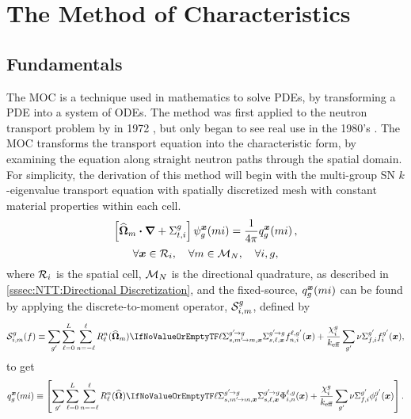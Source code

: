 \chapter{The Method of Characteristics}{\label{ch:The Method of Characteristics}
    
    
    
    \def\figpath{chapters/03/figures/}
    \graphicspath{ {\figpath} }

    \section{Fundamentals}{\label{sec:MOC:Fundamentals}
        The \acf{MOC} is a technique used in mathematics to solve \acp{PDE}, by transforming a \ac{PDE} into a system of \acp{ODE}.
        The method was first applied to the neutron transport problem by \citeauthor{Askew1972} in 1972 \cite{Askew1972}, but only began to see real use in the 1980's \cite{Halsall1980}.
        The \ac{MOC} transforms the transport equation into the characteristic form, by examining the equation along straight neutron paths through the spatial domain.
        For simplicity, the derivation of this method will begin with the multi-group \ac{SN} $k$-eigenvalue transport equation with spatially discretized mesh with constant material properties within each cell.
        \begin{equation}\label{eq:MOC:SSMGFS Transport}
            \left[\dirm\vdot\grad + \xst\right]\aflux[mi][g][\loc] = \rfourpi\source[mi][g][\loc],
        \end{equation}
        \begin{equation*}
            \forall\loc\in\Region, \quad \forall m \in \angquad, \quad \forall i, g,
        \end{equation*}
        where $\Region$ is the spatial cell, $\angquad$ is the directional quadrature, as described in \cref{sssec:NTT:Directional Discretization}, and the fixed-source, $
        \source[mi][g][\loc]$ can be found by applying the discrete-to-moment operator, $\FluxToSource$, defined by
        \begin{equation}\label{eq:MOC:LSA:Flux To Source Operator}
          \FluxToSource(f) \defined
            \suml[\gprime]\suml[\ell=0][L]\suml[n=-\ell][\ell]\SH[\ell][n][\dirm]\xss[\ell]f^{\ell,\gprime}_{n,i}(\loc)
            + \frac{\spect}{\keff}\suml[\gprime]\nufis f^{\gprime}_{i}(\loc),
        \end{equation}
        to get
        \begin{equation}\label{eq:MOC:Source}
            \source[mi][g][\loc] \defined
                \left[\suml[\gprime]\suml[\ell=0][L]\suml[n=-\ell][\ell]\SH\xss[\ell]\afluxmom(\loc) + \frac{\spect}{\keff}\suml[\gprime]\nufis\sflux[\gprime](\loc)\right].
        \end{equation}

}}
